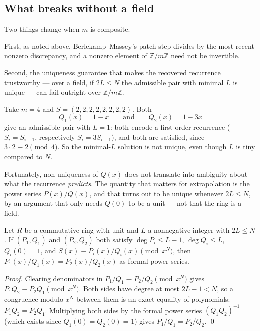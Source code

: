 \documentclass[11pt]{article}
\begin{document}
\subsection{What breaks without a field}
Two things change when $m$ is composite.

First, as noted above, Berlekamp--Massey's patch step divides by the most
recent nonzero discrepancy, and a nonzero element of $\mathbb{Z}/m\mathbb{Z}$
need not be invertible.

Second, the uniqueness guarantee that makes the recovered recurrence
trustworthy --- over a field, if $2L \le N$ the admissible pair with minimal
$L$ is unique --- can fail outright over $\mathbb{Z}/m\mathbb{Z}$.

\begin{examplebox}
Take $m = 4$ and $S = (2,2,2,2,2,2,2,2)$. Both
\[
  Q_1(x) = 1 - x \qquad\text{and}\qquad Q_2(x) = 1 - 3x
\]
give an admissible pair with $L = 1$: both encode a first-order recurrence
($S_i = S_{i-1}$, respectively $S_i = 3S_{i-1}$), and both are satisfied,
since $3 \cdot 2 \equiv 2 \pmod 4$. So the minimal-$L$ solution is not
unique, even though $L$ is tiny compared to $N$.
\end{examplebox}

Fortunately, non-uniqueness of $Q(x)$ does not translate into ambiguity about
what the recurrence \emph{predicts}. The quantity that matters for
extrapolation is the power series $P(x)/Q(x)$, and that turns out to be
unique whenever $2L \le N$, by an argument that only needs $Q(0)$ to be a
unit --- not that the ring is a field.

\begin{theorembox}
Let $R$ be a commutative ring with unit and $L$ a nonnegative integer with
$2L \le N$. If $(P_1, Q_1)$ and $(P_2, Q_2)$ both satisfy $\deg P_i \le L-1$,
$\deg Q_i \le L$, $Q_i(0) = 1$, and $S(x) \equiv P_i(x)/Q_i(x) \pmod{x^N}$,
then $P_1(x)/Q_1(x) = P_2(x)/Q_2(x)$ as formal power series.

\emph{Proof.} Clearing denominators in $P_1/Q_1 \equiv P_2/Q_2 \pmod {x^N}$
gives $P_1 Q_2 \equiv P_2 Q_1 \pmod{x^N}$. Both sides have degree at most
$2L - 1 < N$, so a congruence modulo $x^N$ between them is an exact equality
of polynomials: $P_1 Q_2 = P_2 Q_1$. Multiplying both sides by the formal
power series $(Q_1 Q_2)^{-1}$ (which exists since $Q_1(0) = Q_2(0) = 1$)
gives $P_1/Q_1 = P_2/Q_2$. \qed
\end{theorembox}
\end{document}
